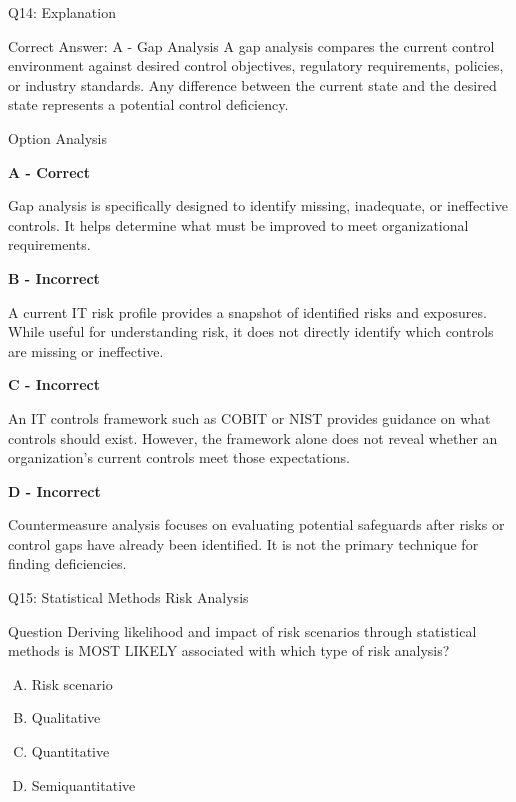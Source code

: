 \documentclass{beamer}
\begin{document}
	\begin{frame}[shrink=10]{Q14: Explanation}
		\footnotesize
		
		\begin{block}{Correct Answer: A - Gap Analysis}
			A gap analysis compares the current control environment against
			desired control objectives, regulatory requirements, policies,
			or industry standards. Any difference between the current state
			and the desired state represents a potential control deficiency.
		\end{block}
		
		\begin{block}{Option Analysis}
			
			\textbf{A - Correct}
			
			Gap analysis is specifically designed to identify missing,
			inadequate, or ineffective controls. It helps determine what
			must be improved to meet organizational requirements.
			
			\vspace{0.15cm}
			
			\textbf{B - Incorrect}
			
			A current IT risk profile provides a snapshot of identified risks
			and exposures. While useful for understanding risk, it does not
			directly identify which controls are missing or ineffective.
			
			\vspace{0.15cm}
			
			\textbf{C - Incorrect}
			
			An IT controls framework such as COBIT or NIST provides guidance
			on what controls should exist. However, the framework alone does
			not reveal whether an organization's current controls meet those
			expectations.
			
			\vspace{0.15cm}
			
			\textbf{D - Incorrect}
			
			Countermeasure analysis focuses on evaluating potential safeguards
			after risks or control gaps have already been identified. It is
			not the primary technique for finding deficiencies.
			
		\end{block}
		
	
		
	\end{frame}
	
	
	\begin{frame}{Q15: Statistical Methods Risk Analysis}
		\begin{block}{Question}
			Deriving likelihood and impact of risk scenarios through statistical methods is MOST LIKELY associated with which type of risk analysis?
		\end{block}
		\begin{enumerate}[(A)]
			\item Risk scenario
			\item Qualitative
			\item Quantitative
			\item Semiquantitative
		\end{enumerate}
	\end{frame}
	
\end{document}
